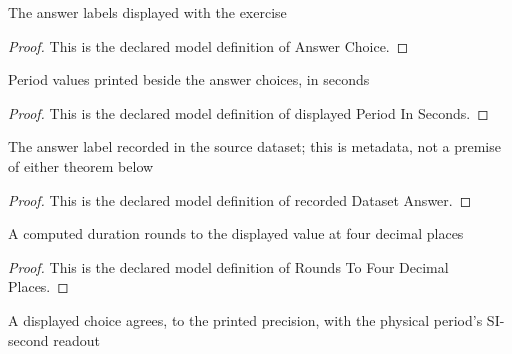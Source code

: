 \begin{definition}
  \label{def:physics:phyx-mini-0268:phyxminiproblems-problemphyxmini0268-answerchoice}
  The answer labels displayed with the exercise
\end{definition}
\begin{proof}
  This is the declared model definition of Answer Choice.
\end{proof}
\begin{definition}
  \label{def:physics:phyx-mini-0268:phyxminiproblems-problemphyxmini0268-displayedperiodinseconds}
  Period values printed beside the answer choices, in seconds
\end{definition}
\begin{proof}
  This is the declared model definition of displayed Period In Seconds.
\end{proof}
\begin{definition}
  \label{def:physics:phyx-mini-0268:phyxminiproblems-problemphyxmini0268-recordeddatasetanswer}
  The answer label recorded in the source dataset; this is metadata, not a premise of either theorem below
\end{definition}
\begin{proof}
  This is the declared model definition of recorded Dataset Answer.
\end{proof}
\begin{definition}
  \label{def:physics:phyx-mini-0268:phyxminiproblems-problemphyxmini0268-roundstofourdecimalplaces}
  A computed duration rounds to the displayed value at four decimal places
\end{definition}
\begin{proof}
  This is the declared model definition of Rounds To Four Decimal Places.
\end{proof}
\begin{definition}
  \label{def:physics:phyx-mini-0268:phyxminiproblems-problemphyxmini0268-matchesanswerchoice}
  A displayed choice agrees, to the printed precision, with the physical period's SI-second readout
\end{definition}
